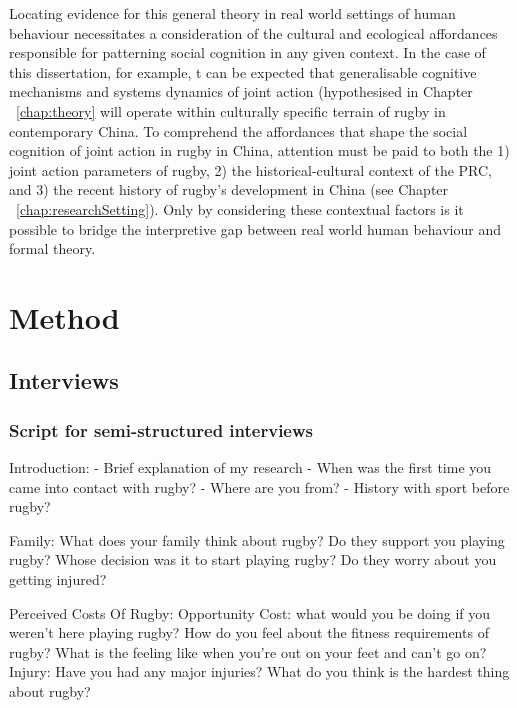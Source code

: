 \begin{CJK}{UTF8}{gbsn}
Locating evidence for this general theory in real world settings of human behaviour necessitates a consideration of the cultural and ecological affordances responsible for patterning social cognition in any given context.  In the case of this dissertation, for example, t can be expected that generalisable cognitive mechanisms and systems dynamics of joint action (hypothesised in Chapter ~\ref{chap:theory} will operate within culturally specific terrain of rugby in contemporary China.  To comprehend the affordances that shape the social cognition of joint action in rugby in China, attention must be paid to both the 1) joint action parameters of rugby, 2) the historical-cultural context of the PRC, and 3) the recent history of rugby's development in China (see Chapter ~\ref{chap:researchSetting}).  Only by considering these contextual factors is it possible to bridge the interpretive gap between real world human behaviour and formal theory.






















\section{Method\label{sect:methodChap4}}

  \subsection{Interviews}
    \subsubsection{Script for semi-structured interviews \label{sect:semiStructured}}


  Introduction:
  - Brief explanation of my research
  - When was the first time you came into contact with rugby?
  - Where are you from?
  - History with sport before rugby?

  Family:
  What does your family think about rugby?
  Do they support you playing rugby?
  Whose decision was it to start playing rugby?
  Do they worry about you getting injured?

  Perceived Costs Of Rugby:
  Opportunity Cost: what would you be doing if you weren’t here playing rugby?
  How do you feel about the fitness requirements of rugby?
  What is the feeling like when you’re out on your feet and can’t go on?
  Injury: Have you had any major injuries?
  What do you think is the hardest thing about rugby?


\end{CJK}
